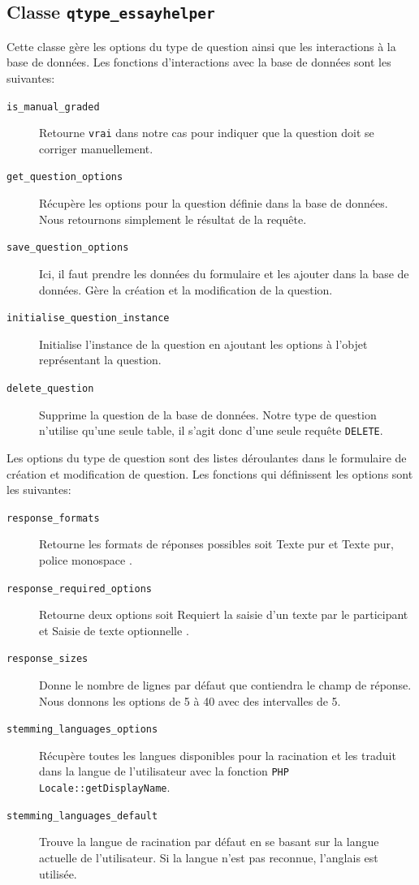 \subsection*{Classe \texttt{qtype\_essayhelper}}
Cette classe g\`ere les options du type de question ainsi que les interactions \`a la base de donn\'ees.
Les fonctions d'interactions avec la base de donn\'ees sont les suivantes:
\begin{description}
  \item[\texttt{is\_manual\_graded}] Retourne \texttt{vrai} dans notre cas pour indiquer que la question doit se corriger manuellement.
  \item[\texttt{get\_question\_options}] R\'ecup\`ere les options pour la question d\'efinie dans la base de donn\'ees. Nous retournons simplement le r\'esultat de la requ\^ete.
  \item[\texttt{save\_question\_options}] Ici, il faut prendre les donn\'ees du formulaire et les ajouter dans la base de donn\'ees. G\`ere la cr\'eation et la modification de la question.
  \item[\texttt{initialise\_question\_instance}] Initialise l'instance de la question en ajoutant les options \`a l'objet repr\'esentant la question.
  \item[\texttt{delete\_question}] Supprime la question de la base de donn\'ees. Notre type de question n'utilise qu'une seule table, il s'agit donc d'une seule requ\^ete \texttt{DELETE}.
\end{description}

Les options du type de question sont des listes d\'eroulantes dans le formulaire de cr\'eation et modification de question.
Les fonctions qui d\'efinissent les options sont les suivantes:
\begin{description}
  \item[\texttt{response\_formats}] Retourne les formats de r\'eponses possibles soit \og Texte pur \fg{} et \og Texte pur, police monospace \fg{} .
  \item[\texttt{response\_required\_options}] Retourne deux options soit \og Requiert la saisie d'un texte par le participant \fg{} et \og Saisie de texte optionnelle \fg{}.
  \item[\texttt{response\_sizes}] Donne le nombre de lignes par d\'efaut que contiendra le champ de r\'eponse. Nous donnons les options de 5 \`a 40 avec des intervalles de 5.
  \item[\texttt{stemming\_languages\_options}] R\'ecup\`ere toutes les langues disponibles pour la racination et les traduit dans la langue de l'utilisateur avec la fonction \texttt{PHP Locale::getDisplayName}.
  \item[\texttt{stemming\_languages\_default}] Trouve la langue de racination par d\'efaut en se basant sur la langue actuelle de l'utilisateur. Si la langue n'est pas reconnue, l'anglais est utilis\'ee.
\end{description}

